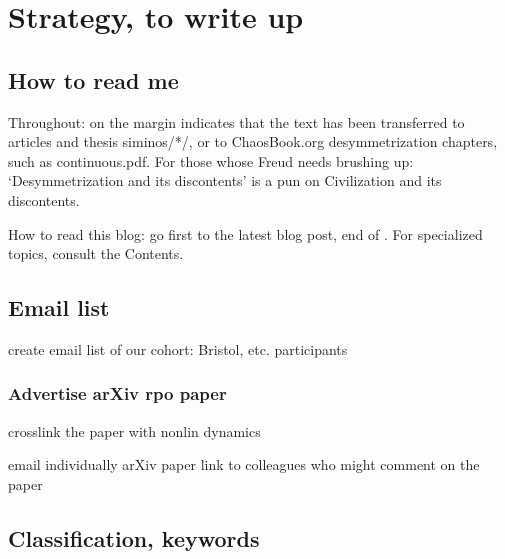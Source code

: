 
\chapter{Strategy, to write up}

\section{How to read me}

Throughout:  {\textdollar} on the margin
{\steady}
indicates that the text has been transferred to
articles and thesis siminos/*/,  or to ChaosBook.org desymmetrization
chapters, such as
{continuous.pdf}.
%
For those whose Freud needs brushing up:
`Desymmetrization and its discontents' is a pun
on 
{Civilization and its discontents}.

How to read this blog: go first to the latest blog post, end
of . For specialized topics, consult the
Contents.


\section{Email list}

create email list of our cohort:  Bristol, etc. participants

\subsection{Advertise arXiv rpo paper}

crosslink the paper with nonlin dynamics

email individually arXiv paper link to colleagues who might comment
    on the paper

\section{Classification, keywords}

